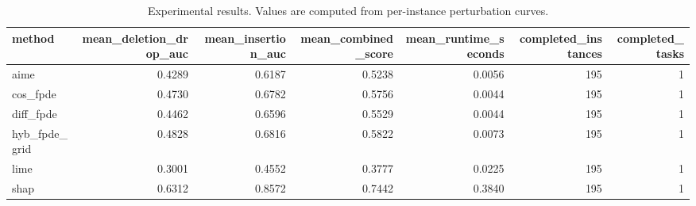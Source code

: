 \begin{table}[t]
\caption{Experimental results. Values are computed from per-instance perturbation curves.}
\label{tab:main_results_computed}
\centering
\begin{tabular}{lrrrrrr}
\toprule
method & mean\_deletion\_drop\_auc & mean\_insertion\_auc & mean\_combined\_score & mean\_runtime\_seconds & completed\_instances & completed\_tasks \\
\midrule
aime & 0.4289 & 0.6187 & 0.5238 & 0.0056 & 195 & 1 \\
cos\_fpde & 0.4730 & 0.6782 & 0.5756 & 0.0044 & 195 & 1 \\
diff\_fpde & 0.4462 & 0.6596 & 0.5529 & 0.0044 & 195 & 1 \\
hyb\_fpde\_grid & 0.4828 & 0.6816 & 0.5822 & 0.0073 & 195 & 1 \\
lime & 0.3001 & 0.4552 & 0.3777 & 0.0225 & 195 & 1 \\
shap & 0.6312 & 0.8572 & 0.7442 & 0.3840 & 195 & 1 \\
\bottomrule
\end{tabular}

\end{table}

